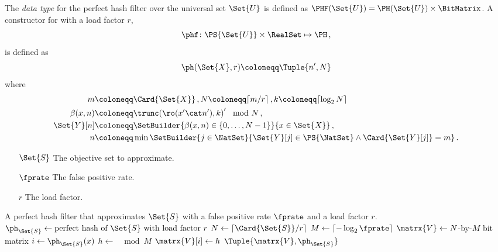The \emph{data type} for the perfect hash filter over the universal set $\Set{U}$ is defined as $\PHF(\Set{U}) = \PH(\Set{U}) \times \BitMatrix$.
A constructor for \PHF with a load factor $r$,
\begin{equation}
\phf \colon \PS{\Set{U}} \times \RealSet \mapsto \PH\,,
\end{equation}
is defined as
\begin{equation}
\ph(\Set{X}, r) \coloneqq \Tuple{n',N}
\end{equation}
where
\begin{equation}
\begin{split}
m			& \coloneqq \Card{\Set{X}}\,, N \coloneqq \lceil m / r \rceil\,,k \coloneqq \lceil\log_2 N\rceil\\
\beta(x,n) 	& \coloneqq \trunc\!\left(\ro(x' \cat n'),k\right)' \mod N\,,\\
\Set{Y}[n] 	& \coloneqq \SetBuilder{\beta(x,n) \in \{0,\ldots,N-1\}}{x \in 
	\Set{X}}\,,\\
n 			& \coloneqq \min{\SetBuilder{ j \in \NatSet }{ \Set{Y}[j] \in \PS{\NatSet} \land \Card{\Set{Y}[j]} = m}}\,.
\end{split}
\end{equation}








\begin{algorithm}[h]
    \label{alg:PHF}
    \KwIn
    {
        \begin{itemize}
            \item[$\Set{S}$] The objective set to approximate.
            \item[$\fprate$] The false positive rate.
            \item[$r$] The load factor.
        \end{itemize}
    }
    \KwOut
    {
        A perfect hash filter that approximates $\Set{S}$ with a false positive rate $\fprate$ and a load factor $r$.
    }
    {
        $\ph_{\Set{S}} \gets \text{perfect hash of $\Set{S}$ with load factor $r$}$\;
        $N \gets \left\lceil \Card{\Set{S}} / r \right\rceil$\;
        $M \gets \left\lceil -\log_2 \fprate \right\rceil$\;
        $\matrx{V} \gets N$-by-$M$ bit matrix\;
        {
            $i \gets \ph_{\Set{S}}(x)$\;
            $h \gets$ $\mod M$\;
            $\matrx{V}[i] \gets h$\;
        }
        \Return $\Tuple{\matrx{V}, \ph_{\Set{S}}}$\;
    }
\end{algorithm}

